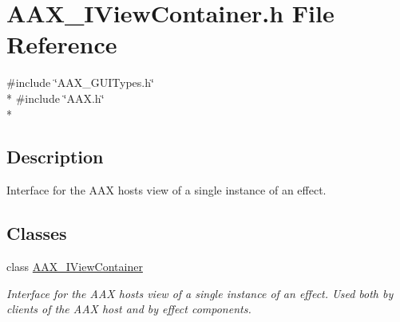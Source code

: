 \hypertarget{a00264}{}\section{A\+A\+X\+\_\+\+I\+View\+Container.\+h File Reference}
\label{a00264}
{\ttfamily \#include \char`\"{}A\+A\+X\+\_\+\+G\+U\+I\+Types.\+h\char`\"{}}\\*
{\ttfamily \#include \char`\"{}A\+A\+X.\+h\char`\"{}}\\*


\subsection{Description}
Interface for the A\+A\+X host\textquotesingle{}s view of a single instance of an effect. 

\subsection*{Classes}
\begin{DoxyCompactItemize}
\item 
class \hyperlink{a00117}{A\+A\+X\+\_\+\+I\+View\+Container}
\begin{DoxyCompactList}\small\item\em Interface for the A\+A\+X host\textquotesingle{}s view of a single instance of an effect. Used both by clients of the A\+A\+X host and by effect components. \end{DoxyCompactList}\end{DoxyCompactItemize}
